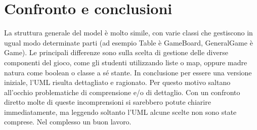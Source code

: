 \documentclass[12pt]{report}
\begin{document}
	\section*{Confronto e conclusioni}
		La struttura generale del model è molto simile, con varie classi che gestiscono in ugual modo determinate parti (ad esempio Table è GameBoard, GeneralGame è Game). Le principali differenze sono sulla scelta di gestione delle diverse componenti del gioco, come gli studenti utilizzando liste o map, oppure madre natura come boolean o classe a sé stante.
		In conclusione per essere una versione iniziale, l'UML risulta dettagliato e ragionato. Per questo motivo saltano all'occhio problematiche di comprensione e/o di dettaglio. Con un confronto diretto molte di queste incomprensioni si sarebbero potute chiarire immediatamente, ma leggendo soltanto l'UML alcune scelte non sono state comprese. Nel complesso un buon lavoro.
\end{document}
